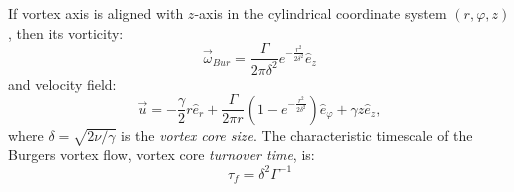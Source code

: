 \documentclass[../main.tex]{subfiles}
\begin{document}
If vortex axis is aligned with $z$-axis in the cylindrical coordinate system $(r, \varphi, z)$, then its vorticity:
\begin{equation}
\vec{\omega}_{Bur}=\frac{\Gamma}{2 \pi \delta^2} e^{-\frac{r^2}{2 \delta^2}} \hat{e}_z
\label{def:omega_Bur}
\end{equation}
and velocity field:
\begin{equation}
\vec{u}=-\frac{\gamma}{2} r \hat{e}_r+\frac{\Gamma}{2 \pi r} \left(1-e^{-\frac{r^2}{2\delta^2}}\right)\hat{e}_{\varphi}+\gamma z \hat{e}_z,
\label{def_Bur}
\end{equation}
where $\delta=\sqrt{2 \nu / \gamma}$ is the \emph{vortex core size}. The characteristic timescale of the Burgers vortex flow, vortex core \emph{turnover time}, is:
\begin{equation}
\tau_f=\delta^2 \Gamma^{-1}
\label{def:tau_f}
\end{equation}
\end{document}
